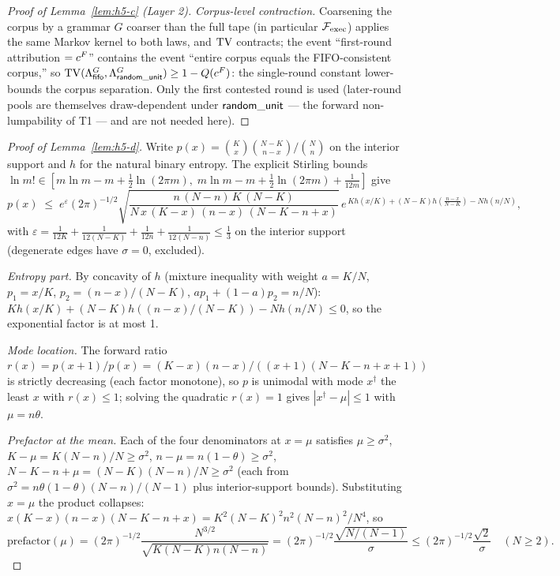 \begin{proof}[Proof of Lemma~\ref{lem:h5-c} (Layer 2)]
\emph{Corpus-level contraction.} Coarsening the corpus by a grammar $G$
coarser than the full tape (in particular $\mathcal{F}_{\mathrm{exec}}$) applies the same Markov
kernel to both laws, and $\operatorname{TV}$ contracts; the event ``first-round
attribution $= c^{F}$'' contains the event ``entire corpus equals the
FIFO-consistent corpus,'' so
$\operatorname{TV}(\Lambda^{G}_{\mathsf{fifo}}, \Lambda^{G}_{\mathsf{random\_unit}}) \ge 1 - Q(c^{F})$: the
single-round constant lower-bounds the corpus separation. Only the first
contested round is used (later-round pools are themselves draw-dependent
under $\mathsf{random\_unit}$ --- the forward non-lumpability of T1 --- and are not needed
here).
\end{proof}

\begin{proof}[Proof of Lemma~\ref{lem:h5-d}]
Write $p(x) = \binom{K}{x}\binom{N-K}{n-x}/\binom{N}{n}$ on the interior
support and $h$ for the natural binary entropy. The explicit Stirling
bounds
$\ln m! \in [m\ln m - m + \tfrac{1}{2}\ln(2\pi m),\; m\ln m - m +
\tfrac{1}{2}\ln(2\pi m) + \tfrac{1}{12m}]$
give
\[
p(x) \;\le\; e^{\varepsilon}(2\pi)^{-1/2}
\sqrt{\frac{n\,(N-n)\,K\,(N-K)}
{N\,x\,(K-x)\,(n-x)\,(N-K-n+x)}}\,
e^{\,Kh(x/K) + (N-K)h\!\left(\frac{n-x}{N-K}\right) - Nh(n/N)},
\]
with
$\varepsilon = \tfrac{1}{12K} + \tfrac{1}{12(N-K)} + \tfrac{1}{12n} +
\tfrac{1}{12(N-n)} \le \tfrac{1}{3}$ on the interior support (degenerate
edges have $\sigma = 0$, excluded).

\emph{Entropy part.} By concavity of $h$ (mixture inequality with weight
$a = K/N$, $p_1 = x/K$, $p_2 = (n-x)/(N-K)$, $ap_1 + (1-a)p_2 = n/N$):
$Kh(x/K) + (N-K)h((n-x)/(N-K)) - Nh(n/N) \le 0$, so the exponential factor
is at most 1.

\emph{Mode location.} The forward ratio
$r(x) = p(x+1)/p(x) = (K-x)(n-x)/((x+1)(N-K-n+x+1))$ is strictly decreasing
(each factor monotone), so $p$ is unimodal with mode $x^{\dagger}$ the least
$x$ with $r(x) \le 1$; solving the quadratic $r(x) = 1$ gives
$|x^{\dagger} - \mu| \le 1$ with $\mu = n\theta$.

\emph{Prefactor at the mean.} Each of the four denominators at $x = \mu$
satisfies $\mu \ge \sigma^2$, $K - \mu = K(N-n)/N \ge \sigma^2$,
$n - \mu = n(1-\theta) \ge \sigma^2$,
$N-K-n+\mu = (N-K)(N-n)/N \ge \sigma^2$ (each from
$\sigma^2 = n\theta(1-\theta)(N-n)/(N-1)$ plus interior-support bounds).
Substituting $x = \mu$ the product collapses:
$x(K-x)(n-x)(N-K-n+x) = K^2(N-K)^2n^2(N-n)^2/N^4$, so
\[
\text{prefactor}(\mu) = (2\pi)^{-1/2}\frac{N^{3/2}}
{\sqrt{K(N-K)n(N-n)}} = (2\pi)^{-1/2}\frac{\sqrt{N/(N-1)}}{\sigma}
\le (2\pi)^{-1/2}\frac{\sqrt{2}}{\sigma} \quad (N \ge 2).
\]


\end{proof}

